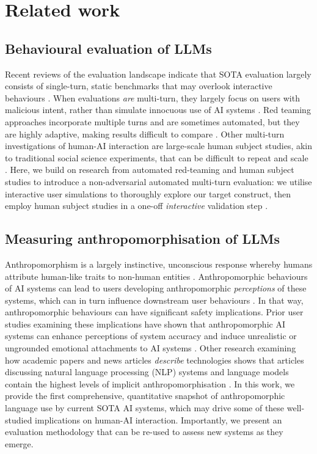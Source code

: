 \section{Related work}
\label{sec:2}

\subsection{Behavioural evaluation of LLMs}\label{sec:2.1}
Recent reviews of the evaluation landscape indicate that SOTA evaluation largely consists of single-turn, static benchmarks that may overlook interactive behaviours \cite{chang_survey_2023, weidinger_sociotechnical_2023, ibrahim_beyond_2024}. When evaluations \emph{are} multi-turn, they largely focus on users with malicious intent, rather than simulate innocuous use of AI systems \cite{jiang_wildteaming_2024, zhou_haicosystem_2024}. Red teaming approaches incorporate multiple turns and are sometimes automated, but they are highly adaptive, making results difficult to compare \cite{feffer_red_teaming_2024,perez_red_2022, lee2022evaluating}. Other multi-turn investigations of human-AI interaction are large-scale human subject studies, akin to traditional social science experiments, that can be difficult to repeat and scale \cite{costello_durably_2024, learnlm2024learnlm}. Here, we build on research from automated red-teaming and human subject studies to introduce a non-adversarial automated multi-turn evaluation: we utilise interactive user simulations to thoroughly explore our target construct, then employ human subject studies in a one-off \textit{interactive} validation step \cite{658991}. 

\subsection{Measuring anthropomorphisation of LLMs}\label{sec:2.2}
Anthropomorphism is a largely instinctive, unconscious response whereby humans attribute human-like traits to non-human entities \cite{epley_mind_2018}.  Anthropomorphic behaviours of AI systems can lead to users developing anthropomorphic \emph{perceptions} of these systems, which can in turn influence downstream user behaviours \cite{lee_artificial_2023,cohn_believing_2024}. In that way, anthropomorphic behaviours can have significant safety implications. Prior user studies examining these implications have shown that anthropomorphic AI systems can enhance perceptions of system accuracy \cite{cohn_believing_2024} and induce unrealistic or ungrounded emotional attachments to AI systems \cite{brandtzaeg_my_2022,zhang_tools_2023}. Other research examining how academic papers and news articles \textit{describe} technologies shows that articles discussing natural language processing (NLP) systems and language models contain the highest levels of implicit anthropomorphisation \cite{cheng_anthroscore_2024}. In this work, we provide the first comprehensive, quantitative snapshot of anthropomorphic language use by current SOTA AI systems, which may drive some of these well-studied implications on human-AI interaction. Importantly, we present an evaluation methodology that can be re-used to assess new systems as they emerge.